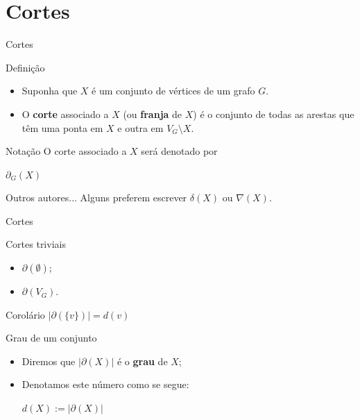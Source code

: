 \documentclass[xcolor=dvipsnames,table]{beamer}
\begin{document}
	\section{Cortes}
	\begin{frame}{Cortes}
		\begin{block}{Definição}
			\begin{itemize}
				\item Suponha que $X$ é um conjunto de vértices de um grafo $G$. \pause
				\item O {\bf corte} associado a $X$ (ou {\bf franja} de $X$) é o conjunto de todas as arestas que têm uma ponta em $X$ e outra em $V_G \setminus X$.
			\end{itemize}
		\end{block} \pause
		\begin{block}{Notação}
			O corte associado a $X$ será denotado por
			\begin{center}
				$\partial_G (X)$
			\end{center}
		\end{block} \pause
		\begin{alertblock}{Outros autores...}
			Alguns preferem escrever $\delta(X)$ ou $\nabla(X)$.
		\end{alertblock}
	\end{frame}
	
	\begin{frame}{Cortes}
		\begin{block}{Cortes triviais}
			\begin{itemize}
				\item $\partial( \emptyset )$; \pause
				\item $\partial( V_G )$.
			\end{itemize}
		\end{block} \pause
		\begin{block}{Corolário}
			$|\partial(\{v\})| = d(v)$
		\end{block} \pause
		\begin{block}{Grau de um conjunto}
			\begin{itemize}
				\item Diremos que $|\partial(X)|$ é o {\bf grau} de $X$; \pause
				\item Denotamos este número como se segue:
				\begin{center}
					$d(X) := |\partial(X)|$
				\end{center}
			\end{itemize}
		\end{block}
	\end{frame}
	
\end{document}
